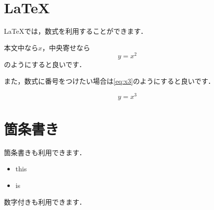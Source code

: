 \section{LaTeX}

LaTeXでは，数式を利用することができます．

本文中なら\(x\)，中央寄せなら\[y = x^2\]のようにすると良いです．

また，数式に番号をつけたい場合は\ref{eq:x3}のようにすると良いです．

\begin{equation}
    y = x^3
    \label{eq:x3}
\end{equation}

\section{箇条書き}

箇条書きも利用できます．

\begin{itemize}
    \item this
    \item is
\end{itemize}

数字付きも利用できます．

